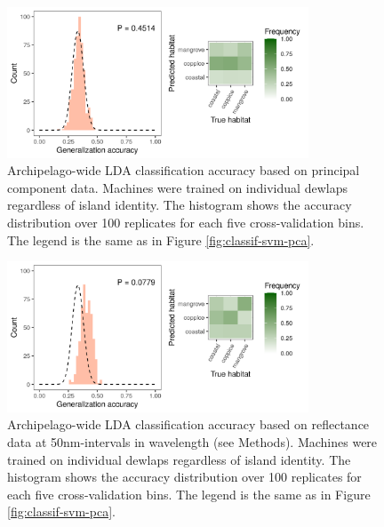 \begin{figure}[H]
	\centering
	\includegraphics[width=0.8\textwidth]{"../analyses/04-machine learning/plots/classif_lda_pca_pooled"}
	\caption{Archipelago-wide LDA classification accuracy based on principal component data. Machines were trained on individual dewlaps regardless of island identity. The histogram shows the accuracy distribution over 100 replicates for each five cross-validation bins. The legend is the same as in Figure \ref{fig:classif-svm-pca}.}
	\label{supfig:classif-lda-pca-pooled}
\end{figure}

\begin{figure}[H]
	\centering
	\includegraphics[width=0.8\textwidth]{"../analyses/04-machine learning/plots/classif_lda_refl_pooled"}
	\caption{Archipelago-wide LDA classification accuracy based on reflectance data at 50nm-intervals in wavelength (see Methods). Machines were trained on individual dewlaps regardless of island identity. The histogram shows the accuracy distribution over 100 replicates for each five cross-validation bins. The legend is the same as in Figure \ref{fig:classif-svm-pca}.}
	\label{supfig:classif-lda-refl-pooled}
\end{figure}


